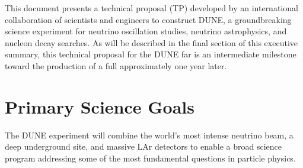 This document presents 
a technical proposal (TP) developed by an international collaboration of scientists and engineers to construct DUNE,
a groundbreaking science experiment for  neutrino oscillation studies, neutrino astrophysics, and nucleon decay searches. As will be described in the final section of this executive summary, this technical proposal for the DUNE far  is an intermediate milestone toward the production of a full  approximately one year later.


%

\section{Primary Science Goals} %


The DUNE experiment will combine the world's most intense neutrino beam, a deep underground site, and massive LAr detectors to enable a broad science program addressing some of the most fundamental questions in particle physics. 


